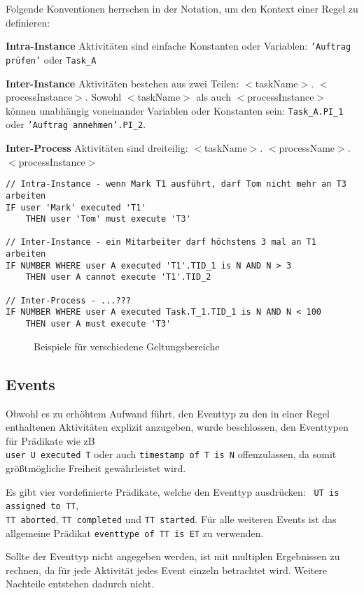 Folgende Konventionen herrschen in der Notation, um den Kontext einer Regel zu definieren:

\textbf{Intra-Instance} Aktivitäten sind einfache Konstanten oder Variablen: \texttt{'Auftrag prüfen'} oder \texttt{Task\_A}

\textbf{Inter-Instance} Aktivitäten bestehen aus zwei Teilen:  $<$taskName$>$. $<$processInstance$>$. Sowohl $<$taskName$>$ als auch  $<$processInstance$>$ können unabhängig voneinander Variablen oder Konstanten sein: \texttt{Task\_A.PI\_1} oder \texttt{'Auftrag annehmen'.PI\_2}.

\textbf{Inter-Process} Aktivitäten sind dreiteilig:  $<$taskName$>$. $<$processName$>$. $<$processInstance$>$

\begin{verbatim}
// Intra-Instance - wenn Mark T1 ausführt, darf Tom nicht mehr an T3 arbeiten
IF user 'Mark' executed 'T1'
    THEN user 'Tom' must execute 'T3'

// Inter-Instance - ein Mitarbeiter darf höchstens 3 mal an T1 arbeiten
IF NUMBER WHERE user A executed 'T1'.TID_1 is N AND N > 3
    THEN user A cannot execute 'T1'.TID_2

// Inter-Process - ...???
IF NUMBER WHERE user A executed Task.T_1.TID_1 is N AND N < 100
    THEN user A must execute 'T3'
\end{verbatim}
\begin{figure}[!h]
\caption{Beispiele für verschiedene Geltungsbereiche}
\label{fig:exampleinterinstance}
\end{figure}

\subsection{Events}
Obwohl es zu erhöhtem Aufwand führt, den Eventtyp zu den in einer Regel enthaltenen Aktivitäten explizit anzugeben, wurde beschlossen, den Eventtypen für Prädikate wie zB \\\texttt{user U executed T} oder auch \texttt{timestamp of T is N} offenzulassen, da somit größtmögliche Freiheit gewährleistet wird. 

Es gibt vier vordefinierte Prädikate, welche den Eventtyp ausdrücken: \texttt{ UT is assigned to TT},\\
\texttt{TT aborted}, \texttt{TT completed} und \texttt{TT started}. Für alle weiteren Events ist das allgemeine Prädikat \texttt{eventtype of TT is ET} zu verwenden.

Sollte der Eventtyp nicht angegeben werden, ist mit multiplen Ergebnissen zu rechnen, da für jede Aktivität jedes Event einzeln betrachtet wird. Weitere Nachteile entstehen dadurch nicht.


